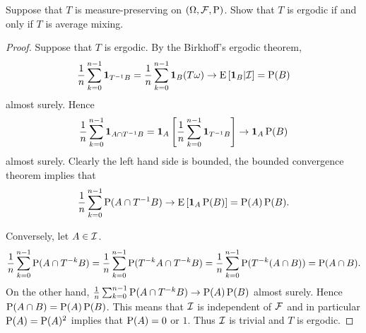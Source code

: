 \begin{proposition}
    Suppose that $T$ is measure-preserving on $(\Omega,\F,\P)$. Show that 
    $T$ is ergodic if and only if $T$ is average mixing. 
\end{proposition}
\begin{proof}
    Suppose that $T$ is ergodic. By the Birkhoff's ergodic theorem, 
    \begin{equation*}
        \frac{1}{n}\sum_{k=0}^{n-1}\one_{T^{-1}B}
        = \frac{1}{n}\sum_{k=0}^{n-1}\one_B(T\omega) \to 
        \E\sbrc{\one_B|\I} = \P(B)
    \end{equation*}
    almost surely. Hence 
    \begin{equation*}
        \frac{1}{n}\sum_{k=0}^{n-1}\one_{A\cap T^{-1}B} 
        = \one_A\sbrc{\frac{1}{n}\sum_{k=0}^{n-1}\one_{T^{-1}B}} 
        \to \one_A\P(B)
    \end{equation*}
    almost surely. Clearly the left hand side is bounded, the bounded convergence 
    theorem implies that 
    \begin{equation*}
        \frac{1}{n}\sum_{k=0}^{n-1}\P(A\cap T^{-1}B)\to\E\sbrc{\one_A\P(B)} = \P(A)\P(B).
    \end{equation*}

    Conversely, let $A\in\I$. 
    \begin{equation*}
        \frac{1}{n}\sum_{k=0}^{n-1}\P(A\cap T^{-k}B) 
        = \frac{1}{n}\sum_{k=0}^{n-1}\P(T^{-k}A\cap T^{-k}B)  
        = \frac{1}{n}\sum_{k=0}^{n-1}\P(T^{-k}(A\cap B))  
        = \P(A\cap B). 
    \end{equation*}
    On the other hand, $\frac{1}{n}\sum_{k=0}^{n-1}\P(A\cap T^{-k}B)\to\P(A)\P(B)$ 
    almost surely. Hence $\P(A\cap B) = \P(A)\P(B)$. This means that $\I$ is 
    independent of $\F$ and in particular $\P(A) = \P(A)^2$ implies that $\P(A) = 0$ 
    or $1$. Thus $\I$ is trivial and $T$ is ergodic. 
\end{proof}

